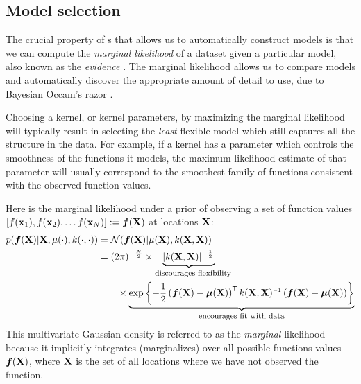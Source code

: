\subsection{Model selection}

The crucial property of \gp{}s that allows us to automatically construct models is that we can compute the \emph{marginal likelihood} of a dataset given a particular model, also known as the \emph{evidence} \citep{mackay1992bayesian}.
The marginal likelihood allows us to compare models and automatically discover the appropriate amount of detail to use, due to Bayesian Occam's razor \citep{rasmussen2001occam,mackay2003information}.

Choosing a kernel, or kernel parameters, by maximizing the marginal likelihood will typically result in selecting the \emph{least} flexible model which still captures all the structure in the data.
For example, if a kernel has a parameter which controls the smoothness of the functions it models, the maximum-likelihood estimate of that parameter will usually correspond to the smoothest family of functions consistent with the observed function values.

Here is the marginal likelihood under a \gp{} prior of observing a set of function values $\left[ f({\bf{x}}_1), f({\bf{x}}_2), \ldots f({\bf{x}}_N)  \right] \mathrel{:\mkern-0.25mu=} \boldsymbol{f}(\mathbf{X})$ at locations $\mathbf{X}$:
%
\begin{align}
p(\funcval | \vX, \mu(\cdot), k(\cdot, \cdot)) & = \N{\funcval}{\mu(\vX)}{k(\vX, \vX)} \label{eq:gp_marg_lik} \\
& = (2\pi)^{-\frac{N}{2}} \times \underwrite{ |k(\vX, \vX)|^{-\frac{1}{2}}\,}{\parbox{2.5cm}{\parbox{3.5cm}{\footnotesize discourages flexibility}}} \nonumber \\
 & \qquad \times \underwrite{\exp \left\{ -\frac{1}{2} \left( \funcval - \boldsymbol\mu(\vX) \right)\tra k(\vX, \vX)\inv \left(\funcval - \boldsymbol\mu(\vX) \right) \right\}}{\footnotesize encourages fit with data} \nonumber
\end{align}
%
This multivariate Gaussian density is referred to as the \emph{marginal} likelihood because it implicitly integrates (marginalizes) over all possible functions values $\boldsymbol{f}( \bar {\mathbf{X}})$, where $\bar {\mathbf{X}}$ is the set of all locations where we have not observed the function.

